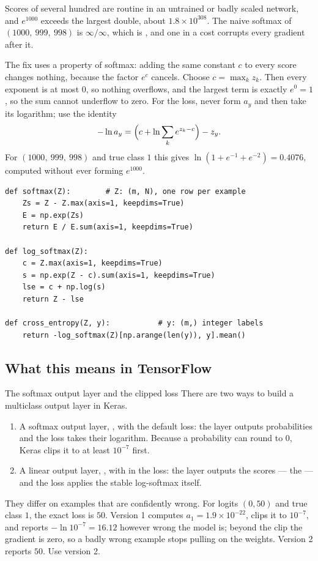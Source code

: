 Scores of several hundred are routine in an untrained or badly scaled network,
and $e^{1000}$ exceeds the largest double, about $1.8\times10^{308}$. The naive
softmax of $(1000,\ 999,\ 998)$ is $\infty/\infty$, which is , and one
 in a cost corrupts every gradient after it.

The fix uses a property of softmax: adding the same constant $c$ to every score
changes nothing, because the factor $e^c$ cancels. Choose $c = \max_k z_k$. Then
every exponent is at most $0$, so nothing overflows, and the largest term is
exactly $e^0 = 1$, so the sum cannot underflow to zero. For the loss, never form
$a_y$ and then take its logarithm; use the identity
\[
  -\ln a_y = \Bigl(c + \ln\sum_k e^{z_k - c}\Bigr) - z_y .
\]
For $(1000,\ 999,\ 998)$ and true class $1$ this gives
$\ln(1 + e^{-1} + e^{-2}) = 0.4076$, computed without ever forming $e^{1000}$.

\begin{lstlisting}[style=pythonml, caption={Stable softmax and log-softmax.}, label={lst:stable-softmax}]
def softmax(Z):        # Z: (m, N), one row per example
    Zs = Z - Z.max(axis=1, keepdims=True)
    E = np.exp(Zs)
    return E / E.sum(axis=1, keepdims=True)

def log_softmax(Z):
    c = Z.max(axis=1, keepdims=True)
    s = np.exp(Z - c).sum(axis=1, keepdims=True)
    lse = c + np.log(s)
    return Z - lse

def cross_entropy(Z, y):           # y: (m,) integer labels
    return -log_softmax(Z)[np.arange(len(y)), y].mean()
\end{lstlisting}

\subsection{What this means in TensorFlow}

\begin{pitfall}{The softmax output layer and the clipped loss}
There are two ways to build a multiclass output layer in Keras.
\begin{enumerate}\raggedright
  \item A softmax output layer, , with
        the default loss: the layer outputs probabilities and the loss takes
        their logarithm. Because a probability can round to $0$, Keras clips it
        to at least $10^{-7}$ first.
  \item A linear output layer, , with
         in the loss: the layer outputs the scores ---
        the  --- and the loss applies the stable log-softmax
        itself.
\end{enumerate}
They differ on examples that are confidently wrong. For logits $(0, 50)$ and
true class $1$, the exact loss is $50$. Version 1 computes $a_1 = 1.9\times10^{-22}$,
clips it to $10^{-7}$, and reports $-\ln 10^{-7} = 16.12$ however wrong the
model is; beyond the clip the gradient is zero, so a badly wrong example stops
pulling on the weights. Version 2 reports $50$. Use version 2.
\end{pitfall}


